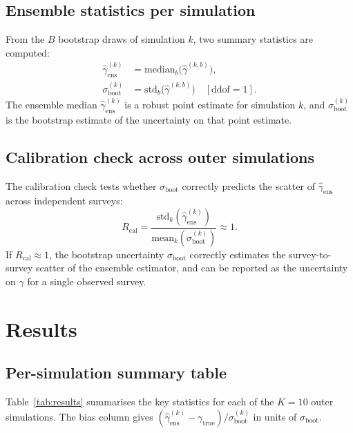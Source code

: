 \documentclass[11pt,a4paper]{article}
\begin{document}
\subsection{Ensemble statistics per simulation}
\label{sec:ensemble}

From the $B$ bootstrap draws of simulation $k$, two summary statistics are
computed:
\begin{align}
  \hat\gamma_\mathrm{ens}^{(k)} &= \mathrm{median}_b\bigl(\hat\gamma^{(k,b)}\bigr),
  \label{eq:gamma_ens}\\
  \sigma_\mathrm{boot}^{(k)} &= \mathrm{std}_b\bigl(\hat\gamma^{(k,b)}\bigr)
  \quad [\text{ddof}=1].
  \label{eq:sigma_boot}
\end{align}
The ensemble median $\hat\gamma_\mathrm{ens}^{(k)}$ is a robust point estimate
for simulation $k$, and $\sigma_\mathrm{boot}^{(k)}$ is the bootstrap estimate
of the uncertainty on that point estimate.

\subsection{Calibration check across outer simulations}
\label{sec:calcheck}

The calibration check tests whether $\sigma_\mathrm{boot}$ correctly predicts
the scatter of $\hat\gamma_\mathrm{ens}$ across independent surveys:
\begin{equation}
  \boxed{R_\mathrm{cal}
  = \frac{\mathrm{std}_k\!\left(\hat\gamma_\mathrm{ens}^{(k)}\right)}
         {\mathrm{mean}_k\!\left(\sigma_\mathrm{boot}^{(k)}\right)}
  \approx 1.}
  \label{eq:rcal}
\end{equation}
If $R_\mathrm{cal} \approx 1$, the bootstrap uncertainty $\sigma_\mathrm{boot}$
correctly estimates the survey-to-survey scatter of the ensemble estimator, and
can be reported as the uncertainty on $\gamma$ for a single observed survey.

\section{Results}

\subsection{Per-simulation summary table}
\label{sec:table}

Table~\ref{tab:results} summarises the key statistics for each of the $K = 10$
outer simulations.  The bias column gives
$(\hat\gamma_\mathrm{ens}^{(k)} - \gamma_\mathrm{true})/\sigma_\mathrm{boot}^{(k)}$
in units of $\sigma_\mathrm{boot}$.
\end{document}
